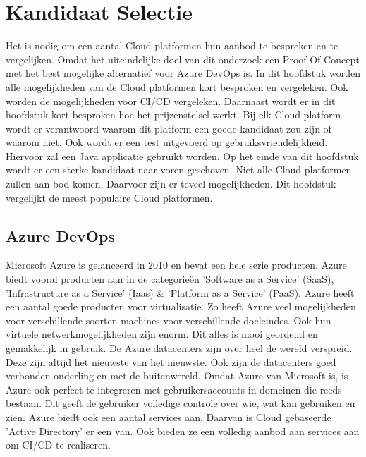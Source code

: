 \chapter{Kandidaat Selectie}
\label{ch:kandidaatselectie}
Het is nodig om een aantal Cloud platformen hun aanbod te bespreken en te vergelijken. Omdat het uiteindelijke doel van dit onderzoek een Proof Of Concept met het best mogelijke alternatief voor Azure DevOps is. In dit hoofdstuk worden alle mogelijkheden van de Cloud platformen kort besproken en vergeleken. Ook worden de mogelijkheden voor CI/CD vergeleken. Daarnaast wordt er in dit hoofdstuk kort besproken hoe het prijzenstelsel werkt. Bij elk Cloud platform wordt er verantwoord waarom dit platform een goede kandidaat zou zijn of waarom niet. Ook wordt er een test uitgevoerd op gebruiksvriendelijkheid. Hiervoor zal een Java applicatie gebruikt worden. Op het einde van dit hoofdstuk wordt er een sterke kandidaat naar voren geschoven. Niet alle Cloud platformen zullen aan bod komen. Daarvoor zijn er teveel mogelijkheden. Dit hoofdstuk vergelijkt de meest populaire Cloud platformen.

\section{Azure DevOps}
\label{sec:azuredevops}
Microsoft Azure is gelanceerd in 2010 en bevat een hele serie producten. Azure biedt vooral producten aan in de categorieën 'Software as a Service' (SaaS), 'Infrastructure as a Service' (Iaas) \& 'Platform as a Service' (PaaS). Azure heeft een aantal goede producten voor virtualisatie. Zo heeft Azure veel mogelijkheden voor verschillende soorten machines voor verschillende doeleindes. Ook hun virtuele netwerkmogelijkheden zijn enorm. Dit alles is mooi geordend en gemakkelijk in gebruik. De Azure datacenters zijn over heel de wereld verspreid. Deze zijn altijd het nieuwste van het nieuwste. Ook zijn de datacenters goed verbonden onderling en met de buitenwereld. Omdat Azure van Microsoft is, is Azure ook perfect te integreren met gebruikersaccounts in domeinen die reeds bestaan. Dit geeft de gebruiker volledige controle over wie, wat kan gebruiken en zien. Azure biedt ook een aantal services aan. Daarvan is Cloud gebaseerde 'Active Directory' er een van. Ook bieden ze een volledig aanbod aan services aan om CI/CD te realiseren.

